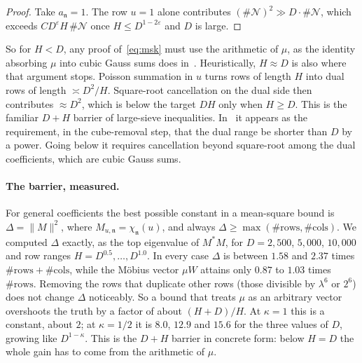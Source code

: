 \documentclass[11pt]{article}
\theoremstyle{remark}
\begin{document}
\begin{proof}
Take $a_{\mathfrak n}=1$. The row $u=1$ alone contributes
$(\#\mathcal N)^2\gg D\cdot\#\mathcal N$, which exceeds $C D^{\varepsilon}H\,\#\mathcal N$
once $H\le D^{1-2\varepsilon}$ and $D$ is large.
\end{proof}

So for $H<D$, any proof of~\eqref{eq:msk} must use the arithmetic of $\mu$, as the identity
absorbing $\mu$ into cubic Gauss sums does in~\cite{OAI}. Heuristically, $H\approx D$ is
also where that argument stops. Poisson summation in $u$ turns rows of length $H$ into dual
rows of length $\asymp D^2/H$. Square-root cancellation on the dual side then contributes
$\approx D^2$, which is below the target $DH$ only when $H\ge D$. This is the familiar
$D+H$ barrier of large-sieve inequalities. In~\cite{OAI} it appears as the requirement, in
the cube-removal step, that the dual range be shorter than $D$ by a power. Going below it
requires cancellation beyond square-root among the dual coefficients, which are cubic Gauss
sums.

\paragraph{The barrier, measured.} For general coefficients the best possible constant in a
mean-square bound is $\Delta=\|M\|^2$, where $M_{u,\mathfrak n}=\chi_{\mathfrak n}(u)$, and
always $\Delta\ge\max(\#\text{rows},\#\text{cols})$. We computed $\Delta$ exactly, as the top
eigenvalue of $M^{*}M$, for $D=2{,}500$, $5{,}000$, $10{,}000$ and row ranges
$H=D^{0.5},\dots,D^{1.0}$. In every case $\Delta$ is between $1.58$ and $2.37$ times
$\#\text{rows}+\#\text{cols}$, while the Möbius vector $\mu W$ attains only $0.87$ to $1.03$
times $\#\text{rows}$. Removing the rows that duplicate other rows (those divisible by
$\lambda^6$ or $2^6$) does not change $\Delta$ noticeably. So a bound that treats $\mu$ as an
arbitrary vector overshoots the truth by a factor of about $(H+D)/H$. At $\kappa=1$ this is a
constant, about $2$; at $\kappa=1/2$ it is $8.0$, $12.9$ and $15.6$ for the three values of
$D$, growing like $D^{1-\kappa}$. This is the $D+H$ barrier in concrete form: below $H=D$ the
whole gain has to come from the arithmetic of $\mu$.
\end{document}
